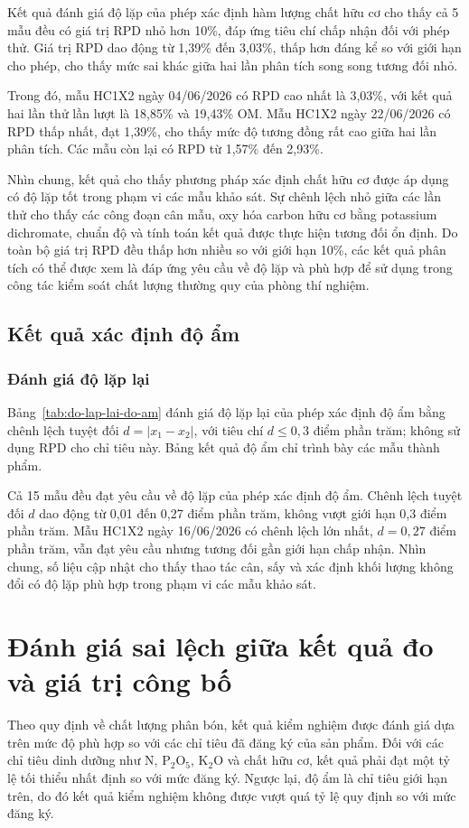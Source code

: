 Kết quả đánh giá độ lặp của phép xác định hàm lượng chất hữu cơ cho thấy cả 5 mẫu đều có giá trị RPD nhỏ hơn 10\%, đáp ứng tiêu chí chấp nhận đối với phép thử. Giá trị RPD dao động từ 1,39\% đến 3,03\%, thấp hơn đáng kể so với giới hạn cho phép, cho thấy mức sai khác giữa hai lần phân tích song song tương đối nhỏ.

Trong đó, mẫu HC1X2 ngày 04/06/2026 có RPD cao nhất là 3,03\%, với kết quả hai lần thử lần lượt là 18,85\% và 19,43\% OM. Mẫu HC1X2 ngày 22/06/2026 có RPD thấp nhất, đạt 1,39\%, cho thấy mức độ tương đồng rất cao giữa hai lần phân tích. Các mẫu còn lại có RPD từ 1,57\% đến 2,93\%.

Nhìn chung, kết quả cho thấy phương pháp xác định chất hữu cơ được áp dụng có độ lặp tốt trong phạm vi các mẫu khảo sát. Sự chênh lệch nhỏ giữa các lần thử cho thấy các công đoạn cân mẫu, oxy hóa carbon hữu cơ bằng potassium dichromate, chuẩn độ và tính toán kết quả được thực hiện tương đối ổn định. Do toàn bộ giá trị RPD đều thấp hơn nhiều so với giới hạn 10\%, các kết quả phân tích có thể được xem là đáp ứng yêu cầu về độ lặp và phù hợp để sử dụng trong công tác kiểm soát chất lượng thường quy của phòng thí nghiệm.

\clearpage
\subsection{Kết quả xác định độ ẩm}
\MoistureResultsTable

\subsubsection{Đánh giá độ lặp lại}
Bảng~\ref{tab:do-lap-lai-do-am} đánh giá độ lặp lại của phép xác định độ ẩm bằng chênh lệch tuyệt đối $d=|x_1-x_2|$, với tiêu chí $d\leq0{,}3$ điểm phần trăm; không sử dụng RPD cho chỉ tiêu này. Bảng kết quả độ ẩm chỉ trình bày các mẫu thành phẩm.



Cả 15 mẫu đều đạt yêu cầu về độ lặp của phép xác định độ ẩm. 
Chênh lệch tuyệt đối $d$ dao động từ 0,01 đến 0,27 điểm phần trăm, không vượt giới hạn 0,3 điểm phần trăm. 
Mẫu HC1X2 ngày 16/06/2026 có chênh lệch lớn nhất, $d=0,27$ điểm phần trăm, vẫn đạt yêu cầu nhưng tương đối gần giới hạn chấp nhận. Nhìn chung, số liệu cập nhật cho thấy thao tác cân, sấy và xác định khối lượng không đổi có độ lặp phù hợp trong phạm vi các mẫu khảo sát.

\section{Đánh giá sai lệch giữa kết quả đo và giá trị công bố}
Theo quy định về chất lượng phân bón, kết quả kiểm nghiệm được đánh giá dựa trên mức độ phù hợp so với các chỉ tiêu đã đăng ký của sản phẩm. Đối với các chỉ tiêu dinh dưỡng như N, $\mathrm{P_2O_5}$, $\mathrm{K_2O}$ và chất hữu cơ, kết quả phải đạt một tỷ lệ tối thiểu nhất định so với mức đăng ký. Ngược lại, độ ẩm là chỉ tiêu giới hạn trên, do đó kết quả kiểm nghiệm không được vượt quá tỷ lệ quy định so với mức đăng ký.

